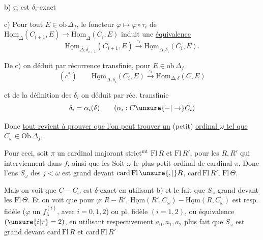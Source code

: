 
b) $\tau_i$ est $\delta_i$-exact

c) Pour tout $E\in\mathrm{ob}\,\Delta_f$, le foncteur $\varphi\longmapsto\varphi\circ\tau_i$ de $\underline{\mathrm{Hom}}_\Delta(C_{i+1},E)\longrightarrow\underline{\mathrm{Hom}}_\Delta(C_i,E)$ induit une \uline{équivalence}
\[
\underline{\mathrm{Hom}}_{\Delta,\delta_{i+1}}(C_{i+1},E)\xrightarrow{\approx}\underline{\mathrm{Hom}}_{\Delta,\delta_i}(C_i,E).
\]


De c) on déduit par récurrence transfinie, pour $E\in\mathrm{ob}\,\Delta_f$
\[
(c^*)\qquad \underline{\mathrm{Hom}}_{\Delta,\delta_i}(C_i,E)\xrightarrow{\approx}\mathrm{Hom}_{\Delta,\delta}(C,E)
\]

et de la définition des $\delta_i$ on déduit par réc. transfinie
\[
\delta_i=\alpha_i(\delta)\qquad(\alpha_i:C\unsure{-|\to}C_i)
\]

Donc \uline{tout revient à prouver que l'on peut trouver un} (petit) \uline{ordinal $\omega$ tel que} $C_\omega\in\mathrm{Ob}\,\Delta_f$, 

Pour ceci, soit $\pi$ un cardinal majorant strict$^{\mathrm{mt}}$ $\mathrm{Fl}\,R$ et $\mathrm{Fl}\,R'$,  pour les $R,R'$ qui interviennent dans $f$, ainsi que les  Soit $\omega$ le plus petit ordinal de cardinal $\pi$. Donc l'ens $S_\omega$ des $j<\omega$ est grand devant $\mathrm{card}\,\mathrm{Fl}\,\unsure{,|{}}R$, $\mathrm{card}\,\mathrm{Fl}\,R'$, $\mathrm{Fl}\,\Theta$.

Mais on voit que $C-C_\omega$ est $\delta$-exact en utilisant b) et le fait que $S_\omega$ grand devant les  $\mathrm{Fl}\,\Theta$. Et on voit que pour $\varphi:R-R'$, $\underline{\mathrm{Hom}}(R',C_\omega)-\underline{\mathrm{Hom}}(R,C_\omega)$ est resp. fidèle ($\varphi$ un $f^{(i)}_\lambda$, avec $i=0,1,2$) ou pl. fidèle $(i=1,2)$, ou équivalence $(\unsure{i|\tau}=2)$, en utilisant respectivement $a_0,a_1,a_2$ plus  fait que $S_\omega$ est grand devant  $\mathrm{card}\,\mathrm{Fl}\,R$ et $\mathrm{card}\,\mathrm{Fl}\,R'$


